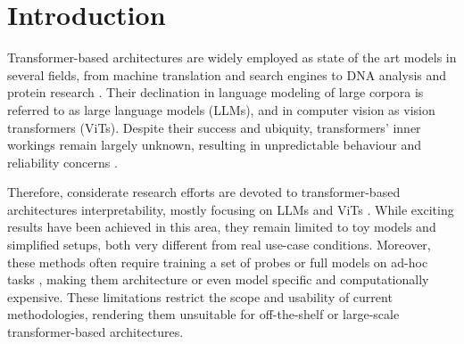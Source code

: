 \section{Introduction} \label{sec:intro}
% 
% 
Transformer-based architectures \citep{vaswani2023attentionneed} are widely employed as state of the art models in several fields, from machine translation and search engines to DNA
analysis and protein research \citep{devlin2018bert,khattab2020colbert,ji2021dnabert,chandra2023transformer}. Their declination in language modeling of large corpora is referred to as large language models (LLMs), and in computer vision as vision transformers (ViTs). Despite their success and ubiquity, transformers' inner workings remain largely unknown,
% 
% 
% 
% 
resulting in unpredictable behaviour \citep{wei2022emergentabilitieslargelanguage} and reliability concerns \citep{schroeder2025trustllmjudgmentsreliability, Huang_2025}.
% 
% 
% 
% 

Therefore, considerate research efforts are devoted to transformer-based architectures interpretability, mostly focusing on LLMs \citep{nanda2022transformerlens, bereska2024mechanisticinterpretabilityaisafety, elhage2021mathematical, elhage2022superposition} and ViTs \citep{chefer2021transformerinterpretabilityattentionvisualization}. 
% 
% 
% 
% 
While exciting results have been achieved in this area, they remain limited to toy models and simplified setups, both very different from real use-case conditions. Moreover, these methods often require training a set of probes \citep{nostalgebraist2020, belrose2023elicitinglatentpredictionstransformers} or full models on ad-hoc tasks \citep{nanda2023progressmeasuresgrokkingmechanistic}, making them architecture or even model specific and computationally expensive. 
% 
% 
% 
% 
These limitations restrict the scope and usability of current methodologies, rendering them unsuitable for off-the-shelf or large-scale transformer-based architectures.
% 
% 
% 
% 

